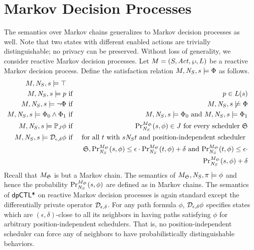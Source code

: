 \section{Markov Decision Processes}
The semantics over Markov chains generalizes to Markov decision
processes as well. Note that two states with different enabled actions
are trivially distinguishable; no privacy can be preserved. Without
loss of generality, we consider reactive Markov decision processes.
Let $M = (S, \Act, \wp, L)$ be a reactive Markov
decision process. Define the satisfaction
relation $M, \neighbor{S}, s \models \Phi$ as follows.
\begin{eqnarray*}
  M, \neighbor{S}, s \models \top\\
  M, \neighbor{S}, s \models p
  & \textmd{ if } &
  p \in L(s)\\
  M, \neighbor{S}, s \models \neg \Phi
  & \textmd{ if } &
  M, \neighbor{S}, s \not\models \Phi\\
  M, \neighbor{S}, s \models \Phi_0 \wedge \Phi_1
  & \textmd{ if } &
  M, \neighbor{S}, s \models \Phi_0 \textmd{ and }
  M, \neighbor{S}, s \models \Phi_1\\
  M, \neighbor{S}, s \models \PJ{J} \phi
  & \textmd{ if } &
  \myPr{s}{M_{\scheduler{S}}}{\neighbor{S}}{\phi} \in J
  \textmd{ for every scheduler } \scheduler{S}\\
  M, \neighbor{S}, s \models \dpriv{\epsilon}{\delta} \phi
  & \textmd{ if } &
  \textmd{for all } t \textmd{ with } s \neighbor{S} t \textmd{ and
   position-independent scheduler } \\
  & & \scheduler{S},
   \myPr{s}{M_{\scheduler{S}}}{\neighbor{S}}{\phi} \leq \epsilon \cdot
   \myPr{t}{M_{\scheduler{S}}}{\neighbor{S}}{\phi} + \delta
   \textmd{ and }
   \myPr{t}{M_{\scheduler{S}}}{\neighbor{S}}{\phi} \leq \epsilon \cdot
  \\
  & &
   \myPr{s}{M_{\scheduler{S}}}{\neighbor{S}}{\phi} + \delta
\end{eqnarray*}
Recall that $M_{\scheduler{S}}$ is but a Markov chain. The semantics
of $M_{\scheduler{S}}, \neighbor{S}, \pi \models \phi$ and hence the
probability $\myPr{s}{M_{\scheduler{S}}}{\neighbor{S}}{\phi}$ are
defined as in Markov chains.
The semantics of $\dpCTL$ on reactive Markov decision processes
is again standard except the differentially private operator
$\dpriv{\epsilon}{\delta}$. For any path formula $\phi$,
$\dpriv{\epsilon}{\delta} \phi$ specifies states which are $(\epsilon,
\delta)$-close to all its neighbors in having paths satisfying $\phi$
for arbitrary position-independent schedulers. That is, no
position-independent scheduler can force any of neighbors to have
probabilistically distinguishable behaviors.

